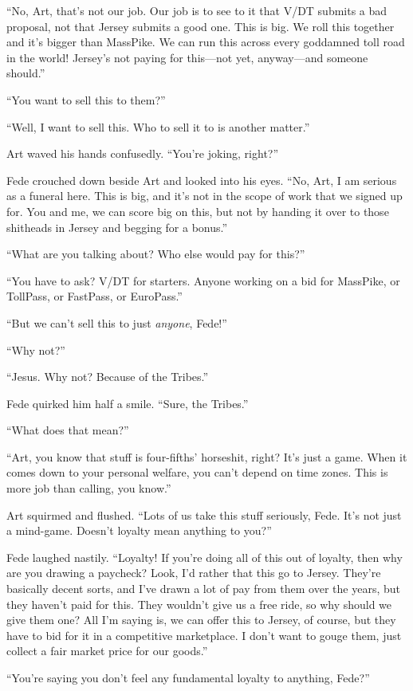 “No, Art, that’s not our job. Our job is to see to it that V/DT
submits a bad proposal, not that Jersey submits a good one. This is
big. We roll this together and it’s bigger than MassPike. We can
run this across every goddamned toll road in the world! Jersey’s
not paying for this—not yet, anyway—and someone should.”

“You want to sell this to them?”

“Well, I want to sell this. Who to sell it to is another matter.”

Art waved his hands confusedly. “You’re joking, right?”

Fede crouched down beside Art and looked into his eyes. “No, Art, I
am serious as a funeral here. This is big, and it’s not in the
scope of work that we signed up for. You and me, we can score big
on this, but not by handing it over to those shitheads in Jersey
and begging for a bonus.”

“What are you talking about? Who else would pay for this?”

“You have to ask? V/DT for starters. Anyone working on a bid for
MassPike, or TollPass, or FastPass, or EuroPass.”

“But we can’t sell this to just \emph{anyone}, Fede!”

“Why not?”

“Jesus. Why not? Because of the Tribes.”

Fede quirked him half a smile. “Sure, the Tribes.”

“What does that mean?”

“Art, you know that stuff is four-fifths’ horseshit, right? It’s
just a game. When it comes down to your personal welfare, you can’t
depend on time zones. This is more job than calling, you know.”

Art squirmed and flushed. “Lots of us take this stuff seriously,
Fede. It’s not just a mind-game. Doesn’t loyalty mean anything to
you?”

Fede laughed nastily. “Loyalty! If you’re doing all of this out of
loyalty, then why are you drawing a paycheck? Look, I’d rather that
this go to Jersey. They’re basically decent sorts, and I’ve drawn a
lot of pay from them over the years, but they haven’t paid for
this. They wouldn’t give us a free ride, so why should we give them
one? All I’m saying is, we can offer this to Jersey, of course, but
they have to bid for it in a competitive marketplace. I don’t want
to gouge them, just collect a fair market price for our goods.”

“You’re saying you don’t feel any fundamental loyalty to anything,
Fede?”

